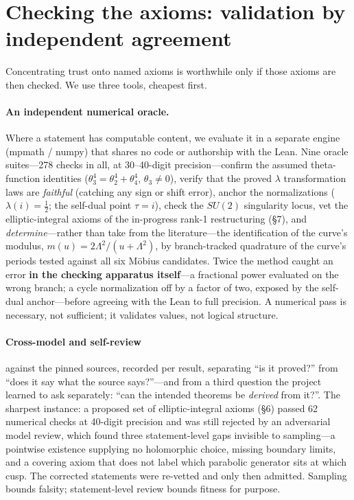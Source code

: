 \documentclass{article}
\theoremstyle{plain}
\theoremstyle{definition}
\numberwithin{equation}{section}
\begin{document}
\section{Checking the axioms: validation by independent agreement}

Concentrating trust onto named axioms is worthwhile only if those axioms are then checked. We
use three tools, cheapest first.

\paragraph{An independent numerical oracle.} Where a statement has computable content, we
evaluate it in a separate engine (mpmath / numpy) that shares no code or authorship with the
Lean. Nine oracle suites---278 checks in all, at 30--40-digit precision---confirm the assumed
theta-function identities ($\theta_3^4 = \theta_2^4 + \theta_4^4$, $\theta_3 \neq 0$), verify that
the proved $\lambda$ transformation laws are \emph{faithful} (catching any sign or shift error),
anchor the normalizations ($\lambda(i) = \tfrac12$; the self-dual point $\tau = i$), check the
$SU(2)$ singularity locus, vet the elliptic-integral axioms of the in-progress rank-1
restructuring (\S7), and \emph{determine}---rather than take from the literature---the
identification of the curve's modulus, $m(u) = 2\Lambda^2/(u+\Lambda^2)$, by branch-tracked
quadrature of the curve's periods tested against all six M\"obius candidates. Twice the method
caught an error \textbf{in the checking apparatus itself}---a fractional power evaluated on the
wrong branch; a cycle normalization off by a factor of two, exposed by the self-dual
anchor---before agreeing with the Lean to full precision.
A numerical pass is necessary, not sufficient; it validates values, not logical structure.

\paragraph{Cross-model and self-review} against the pinned sources, recorded per result,
separating ``is it proved?'' from ``does it say what the source says?''---and from a third
question the project learned to ask separately: ``can the intended theorems be \emph{derived}
from it?''. The sharpest instance: a proposed set of elliptic-integral axioms (\S6)
passed 62 numerical checks at 40-digit precision and was still rejected by an adversarial
model review, which found three statement-level gaps invisible to sampling---a pointwise
existence supplying no holomorphic choice, missing boundary limits, and a covering axiom that
does not label which parabolic generator sits at which cusp. The corrected statements were
re-vetted and only then admitted. Sampling bounds falsity; statement-level review bounds
fitness for purpose.
\end{document}

